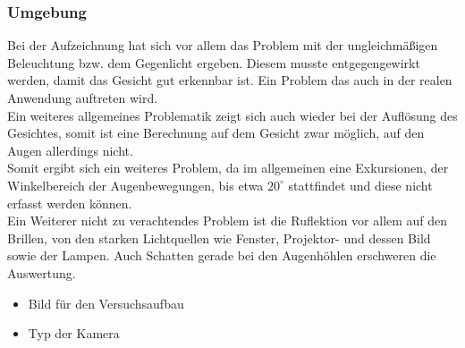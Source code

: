 \subsubsection{Umgebung}
Bei der Aufzeichnung hat sich vor allem das Problem mit der ungleichmäßigen Beleuchtung bzw. dem Gegenlicht ergeben. Diesem musste entgegengewirkt werden, damit das Gesicht gut erkennbar ist. Ein Problem das auch in der realen Anwendung auftreten wird.\\
Ein weiteres allgemeines Problematik zeigt sich auch wieder bei der Auflösung des Gesichtes, somit ist eine Berechnung auf dem Gesicht zwar möglich, auf den Augen allerdings nicht.\\
Somit ergibt sich ein weiteres Problem, da im allgemeinen eine Exkursionen, der Winkelbereich der Augenbewegungen, bis etwa  $20^\circ$ stattfindet und diese nicht erfasst werden können.\\
Ein Weiterer nicht zu verachtendes Problem ist die Ruflektion vor allem auf den Brillen, von den starken Lichtquellen wie Fenster, Projektor- und dessen Bild sowie der Lampen. Auch Schatten gerade bei den Augenhöhlen erschweren die Auswertung. 
\begin{itemize}
	\item Bild für den Versuchsaufbau
	\item Typ der Kamera
\end{itemize}
